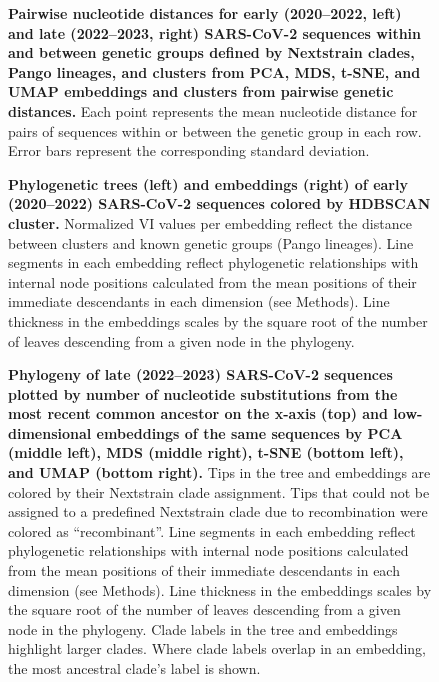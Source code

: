 \documentclass[webpdf,contemporary,large,single]{oup-authoring-template}%
\theoremstyle{thmstyleone}%
\theoremstyle{thmstyletwo}%
\theoremstyle{thmstylethree}%
\begin{document}
\begin{figure}[H]
\caption{{\bf Pairwise nucleotide distances for early (2020--2022, left) and late (2022--2023, right) SARS-CoV-2 sequences within and between genetic groups defined by Nextstrain clades, Pango lineages, and clusters from PCA, MDS, t-SNE, and UMAP embeddings and clusters from pairwise genetic distances.}
  Each point represents the mean nucleotide distance for pairs of sequences within or between the genetic group in each row.
  Error bars represent the corresponding standard deviation.}\label{S_Fig_sarscov2_within_between_group_distances}
\end{figure}

\begin{figure}[H]
\caption{{\bf Phylogenetic trees (left) and embeddings (right) of early (2020--2022) SARS-CoV-2 sequences colored by HDBSCAN cluster.}
  Normalized VI values per embedding reflect the distance between clusters and known genetic groups (Pango lineages).
  Line segments in each embedding reflect phylogenetic relationships with internal node positions calculated from the mean positions of their immediate descendants in each dimension (see Methods).
  Line thickness in the embeddings scales by the square root of the number of leaves descending from a given node in the phylogeny.
}\label{S_Fig_sarscov2_early_embeddings_by_cluster_vs_Nextclade_pango}
\end{figure}

\begin{figure}[H]
\caption{{\bf Phylogeny of late (2022--2023) SARS-CoV-2 sequences plotted by number of nucleotide substitutions from the most recent common ancestor on the x-axis (top) and low-dimensional embeddings of the same sequences by PCA (middle left), MDS (middle right), t-SNE (bottom left), and UMAP (bottom right).}
  Tips in the tree and embeddings are colored by their Nextstrain clade assignment.
  Tips that could not be assigned to a predefined Nextstrain clade due to recombination were colored as ``recombinant''.
  Line segments in each embedding reflect phylogenetic relationships with internal node positions calculated from the mean positions of their immediate descendants in each dimension (see Methods).
  Line thickness in the embeddings scales by the square root of the number of leaves descending from a given node in the phylogeny.
  Clade labels in the tree and embeddings highlight larger clades.
  Where clade labels overlap in an embedding, the most ancestral clade's label is shown.
}
\label{S_Fig_sarscov2_late_embeddings_by_Nextstrain_clade}
\end{figure}
\end{document}
